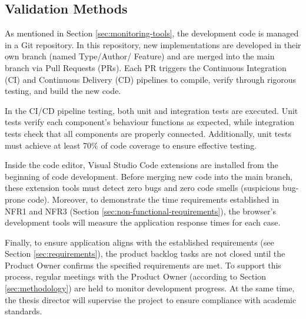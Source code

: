 \subsection{Validation Methods}
\label{sec:validation-methods}

As mentioned in Section \ref{sec:monitoring-tools}, the development code is managed in a Git repository. In this repository, new implementations are developed in their own branch (named Type/Author/ Feature) and are merged into the main branch via Pull Requests (PRs). Each PR triggers the Continuous Integration (CI) and Continuous Delivery (CD) pipelines to compile, verify through rigorous testing, and build the new code.  

In the CI/CD pipeline testing, both unit and integration tests are executed. Unit tests verify each component's behaviour functions as expected, while integration tests check that all components are properly connected. Additionally, unit tests must achieve at least 70\% of code coverage to ensure effective testing.

Inside the code editor, Visual Studio Code extensions are installed from the beginning of code development. Before merging new code into the main branch, these extension tools must detect zero bugs and zero code smells  (suspicious bug-prone code). Moreover, to demonstrate the time requirements established in NFR1 and NFR3 (Section \ref{sec:non-functional-requirements}), the browser's development tools will measure the application response times for each case. 

Finally, to ensure application aligns with the established requirements (see Section \ref{sec:requirements}), the product backlog tasks are not closed until the Product Owner confirms the specified requirements are met. To support this process, regular meetings with the Product Owner (according to Section \ref{sec:methodology}) are held to monitor development progress. At the same time, the thesis director will supervise the project to ensure compliance with academic standards.
